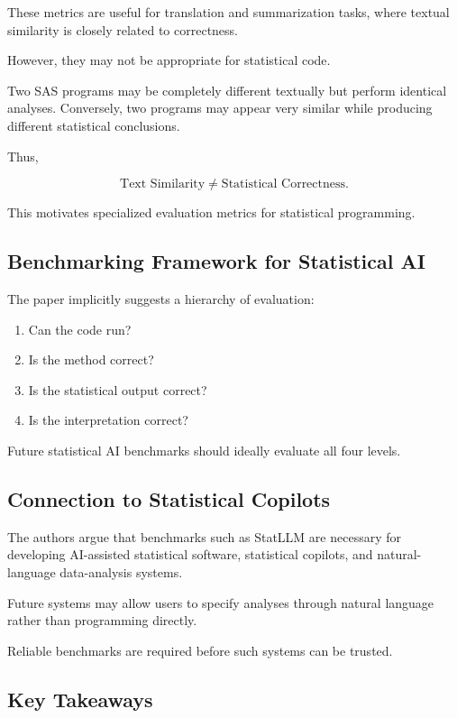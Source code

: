 \documentclass[11pt]{article}
\begin{document}
These metrics are useful for translation and summarization tasks, where textual similarity is closely related to correctness.

However, they may not be appropriate for statistical code.

Two SAS programs may be completely different textually but perform identical analyses. Conversely, two programs may appear very similar while producing different statistical conclusions.

Thus,

\[\text{Text Similarity}\neq\text{Statistical Correctness}.\]

This motivates specialized evaluation metrics for statistical programming.

\subsection*{Benchmarking Framework for Statistical AI}

The paper implicitly suggests a hierarchy of evaluation:

\begin{enumerate}
    \item Can the code run?
    \item Is the method correct?
    \item Is the statistical output correct?
    \item Is the interpretation correct?
\end{enumerate}

Future statistical AI benchmarks should ideally evaluate all four levels.

\subsection*{Connection to Statistical Copilots}

The authors argue that benchmarks such as StatLLM are necessary for developing AI-assisted statistical software, statistical copilots, and natural-language data-analysis systems.

Future systems may allow users to specify analyses through natural language rather than programming directly.

Reliable benchmarks are required before such systems can be trusted.

\subsection*{Key Takeaways}
\end{document}
